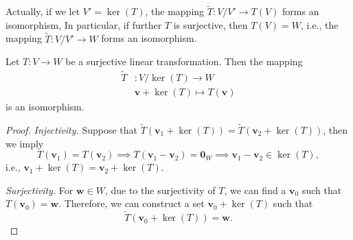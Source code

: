 Actually, if we let $V'=\ker(T)$, the mapping $\tilde{T}:V/ V'\to T(V)$ forms an isomorphism, In particular, if further $T$ is surjective, then $T(V)=W$, i.e., the mapping $\tilde{T}:V/ V'\to W$ forms an isomorphism.
\begin{theorem}
Let $T:V\to W$ be a surjective linear transformation. Then the mapping 
\begin{align*}
\tilde{T}&:V/ \ker(T)\to W\\
&\bm v+\ker(T)\mapsto T(\bm v)
\end{align*}
is an isomorphism.
\end{theorem}
\begin{proof}
\textit{Injectivity.} Suppose that $\tilde{T}(\bm v_1+\ker(T)) = \tilde{T}(\bm v_2+\ker(T))$, then we imply
\[
T(\bm v_1)=T(\bm v_2)\implies T(\bm v_1-\bm v_2)=\bm0_W\implies\bm v_1-\bm v_2\in\ker(T),
\]
i.e., $\bm v_1+\ker(T)=\bm v_2+\ker(T)$.

\textit{Surjectivity.} For $\bm w\in W$, due to the surjectivity of $T$, we can find a $\bm v_0$ such that $T(\bm v_0)=\bm w$. Therefore, we can construct a set $\bm v_0+\ker(T)$ such that
\[
\tilde{T}(\bm v_0+\ker(T))=\bm w.
\]
\end{proof}


















